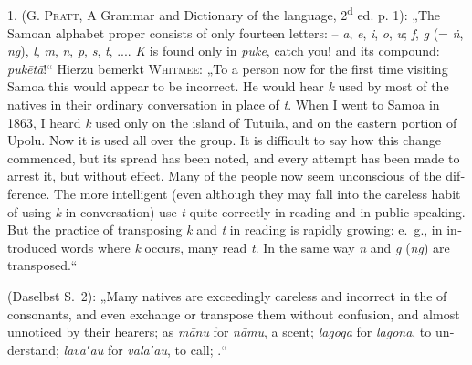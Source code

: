 {\subsection*{}
1.  (\textsc{G. Pratt}, \foreignlanguage{english}{A Grammar and Dictionary of the  language, 2\textsuperscript{d} ed. p. 1): „The Samoan alphabet proper consists of only fourteen letters: – \textit{a}, \textit{e}, \textit{i}, \textit{o}, \textit{u}; \textit{f}, \textit{g} (= \textit{ṅ}, \textit{ng}), \textit{l}, \textit{m}, \textit{n}, \textit{p}, \textit{s}, \textit{t},  .... \textit{K} is found only in \textit{puke}, catch you! and its compound: \textit{pukētā}!}“ Hierzu bemerkt \textsc{Whitmee}: „\foreignlanguage{english}{To a person now for the first time visiting Samoa this would appear to be incorrect. He would hear \textit{k} used by most of the natives in their ordinary conversation in place of \textit{t}. When I went to Samoa in 1863, I heard \textit{k} used only on the island of Tutuila, and on the eastern portion of Upolu. Now it is used all over the group. It is difficult to say how this change commenced, but its spread has been noted, and every attempt has been made to arrest it, but without effect. Many of the people now seem unconscious of the difference. The more intelligent (even although they may fall into the careless habit of using \textit{k} in conversation) use \textit{t} quite correctly in reading and in public speaking. But the practice of transposing \textit{k} and \textit{t} in reading is rapidly \label{fp.202} growing: e.~g., in introduced words where \textit{k} occurs, many read \textit{t}. In the same way \textit{n} and \textit{g} (\textit{ng}) are transposed.}“

(Daselbst S.~2): „\foreignlanguage{english}{Many natives are exceedingly careless and incorrect in the  of consonants, and even exchange or transpose them without confusion, and almost unnoticed by their hearers; as \textit{mānu} for \textit{nāmu}, a scent; \textit{lagoga} for \textit{lagona}, to understand; \textit{lava‛au} for \textit{vala‛au}, to call;   .}“

}
